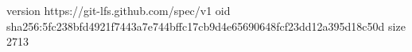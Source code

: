 version https://git-lfs.github.com/spec/v1
oid sha256:5fc238bfd4921f7443a7e744bffc17cb9d4e65690648fcf23dd12a395d18c50d
size 2713
